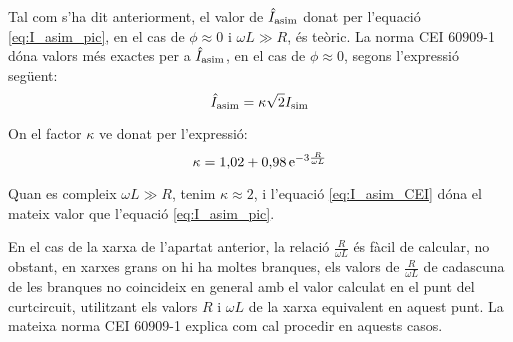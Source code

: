 Tal com s'ha dit anteriorment, el valor de $\hat{I}_\mathrm{asim}$ donat per l'equació \eqref{eq:I_asim_pic}, en el cas de $\phi \approx 0$ i $\omega L\gg R$, és teòric. La norma CEI 60909-1 dóna valors més exactes per a $\hat{I}_\mathrm{asim}$, en el cas de $\phi \approx 0$, segons l'expressió següent:
\begin{equation}
    \hat{I}_\mathrm{asim} = \kappa \sqrt{2} I_\mathrm{sim} \label{eq:I_asim_CEI}
\end{equation}

On el factor $\kappa$ ve donat per l'expressió:
\begin{equation}
    \kappa = 1{,}02 + 0{,}98 \,\mathrm{e}^{-3\frac{R}{\omega L}}\label{eq:kappa_CEI}
\end{equation}

Quan es compleix $\omega L\gg R$, tenim $\kappa \approx 2$, i l'equació \eqref{eq:I_asim_CEI} dóna el mateix valor que l'equació \eqref{eq:I_asim_pic}.

En el cas de la xarxa de l'apartat anterior, la relació $\frac{R}{\omega L}$ és fàcil de  calcular, no obstant, en xarxes grans on hi ha moltes branques, els valors de $\frac{R}{\omega L}$ de cadascuna de les branques no coincideix en general amb el valor calculat en el punt del curtcircuit, utilitzant els valors $R$ i $\omega L$ de la xarxa equivalent en aquest punt. La mateixa norma CEI 60909-1 explica com cal procedir en aquests casos.


